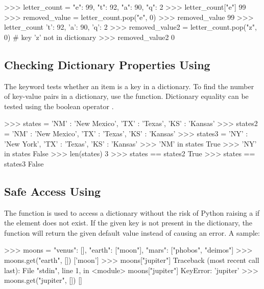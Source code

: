 \documentclass[11pt]{cselabheader}
\begin{document}
\begin{pyconcode}
>>> letter_count = {"e": 99, "t": 92, "a": 90, "q": 2}
>>> letter_count["e"]
99
>>> removed_value = letter_count.pop("e", 0)
>>> removed_value
99
>>> letter_count
{'t': 92, 'a': 90, 'q': 2}
>>> removed_value2 = letter_count.pop("z", 0)  # key 'z' not in dictionary
>>> removed_value2
0

\end{pyconcode}


\subsection{Checking Dictionary Properties Using }

The  keyword tests whether an item is a
key in a dictionary. To find the number of key-value pairs in a dictionary, use the  function.
Dictionary equality can be tested using the boolean operator \pythonindex{==}.

\begin{pyconcode}
>>> states = {'NM' : 'New Mexico', 'TX' : 'Texas', 'KS' : 'Kansas'}
>>> states2 = {'NM' : 'New Mexico', 'TX' : 'Texas', 'KS' : 'Kansas'}
>>> states3 = {'NY' : 'New York', 'TX' : 'Texas', 'KS' : 'Kansas'}
>>> 'NM' in states
True
>>> 'NY' in states
False
>>> len(states)
3
>>> states == states2
True
>>> states == states3
False

\end{pyconcode}


\subsection{Safe Access Using }
The  function is used to access
a dictionary without the risk of Python raising a 
if the element does not exist.
If the given key is not present in the dictionary, the function will return
the given default value instead of causing an error.
A sample:

\begin{pyconcode}
>>> moons = {"venus": [], "earth": ["moon"], "mars": ["phobos", "deimos"]}
>>> moons.get("earth", [])
['moon']
>>> moons["jupiter"]
Traceback (most recent call last):
  File "stdin", line 1, in <module>
    moons["jupiter"]
KeyError: 'jupiter'
>>> moons.get("jupiter", [])
[]

\end{pyconcode}
\end{document}
